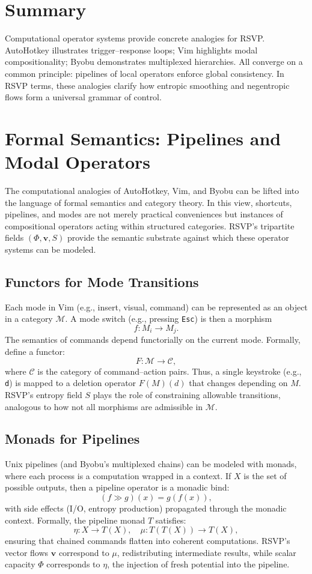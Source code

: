 \documentclass[a4paper,11pt,openany]{book}
\begin{document}
\section{Summary}

Computational operator systems provide concrete analogies for RSVP. AutoHotkey illustrates 
trigger–response loops; Vim highlights modal compositionality; Byobu demonstrates multiplexed 
hierarchies. All converge on a common principle: pipelines of local operators enforce global 
consistency. In RSVP terms, these analogies clarify how entropic smoothing and negentropic 
flows form a universal grammar of control.

\section{Formal Semantics: Pipelines and Modal Operators}

The computational analogies of AutoHotkey, Vim, and Byobu can be lifted into the language of 
formal semantics and category theory. In this view, shortcuts, pipelines, and modes are not 
merely practical conveniences but instances of compositional operators acting within 
structured categories. RSVP’s tripartite fields $(\Phi,\mathbf{v},S)$ provide the semantic 
substrate against which these operator systems can be modeled.

\subsection{Functors for Mode Transitions}

Each mode in Vim (e.g., insert, visual, command) can be represented as an object in a 
category $\mathcal{M}$. A mode switch (e.g., pressing \texttt{Esc}) is then a morphism
\[
f: M_i \to M_j.
\]
The semantics of commands depend functorially on the current mode. Formally, define a 
functor:
\[
F: \mathcal{M} \to \mathcal{C},
\]
where $\mathcal{C}$ is the category of command–action pairs. Thus, a single keystroke 
(e.g., \texttt{d}) is mapped to a deletion operator $F(M)(d)$ that changes depending on 
$M$. RSVP’s entropy field $S$ plays the role of constraining allowable transitions, 
analogous to how not all morphisms are admissible in $\mathcal{M}$.

\subsection{Monads for Pipelines}

Unix pipelines (and Byobu’s multiplexed chains) can be modeled with monads, where each 
process is a computation wrapped in a context. If $X$ is the set of possible outputs, then
a pipeline operator is a monadic bind:
\[
(f \gg g)(x) = g(f(x)),
\]
with side effects (I/O, entropy production) propagated through the monadic context.  
Formally, the pipeline monad $T$ satisfies:
\[
\eta: X \to T(X), \quad \mu: T(T(X)) \to T(X),
\]
ensuring that chained commands flatten into coherent computations. RSVP’s vector flows 
$\mathbf{v}$ correspond to $\mu$, redistributing intermediate results, while scalar 
capacity $\Phi$ corresponds to $\eta$, the injection of fresh potential into the pipeline.
\end{document}
